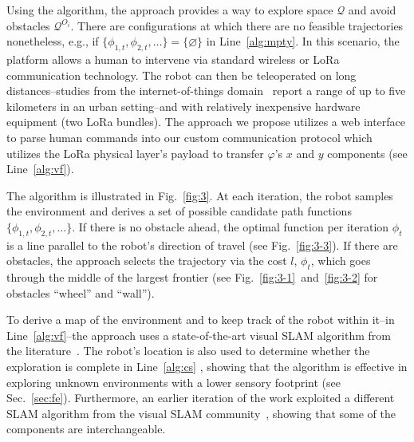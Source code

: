 \documentclass[lettersize,journal,twoside]{IEEEtran}
\theoremstyle{definition}
\begin{document}
Using the algorithm, the %
approach provides a way to explore space $\mathcal{Q}$ and avoid obstacles $\mathcal{Q}^{O_i}$. There are configurations at which there are no feasible trajectories nonetheless, e.g., if $\{\phi_{1,t},\phi_{2,t},\dots\}=\{\varnothing\}$ in Line~\ref{alg:mpty}. In this scenario, the %
platform allows a human to intervene via standard wireless or LoRa communication technology. The robot can then be teleoperated on long distances--studies from the internet-of-things domain~\cite{shanmuga2020survey%
} report a range of up to five kilometers in an urban setting--and with relatively inexpensive hardware equipment (two LoRa bundles). The %
approach we propose utilizes a web interface to parse human commands into our custom communication protocol which utilizes the LoRa physical layer's payload to transfer $\varphi$'s $x$ and $y$ components (see Line~\ref{alg:vf}).

The algorithm is illustrated in Fig.~\ref{fig:3}. At each iteration, the robot samples the environment and derives a set of possible candidate path functions $\{\phi_{1,t},\phi_{2,t},\dots\}$. If there is no obstacle ahead, the optimal function per iteration $\phi_t$ is a line parallel to the robot's direction of travel (see Fig.~\ref{fig:3-3}). If there are obstacles, the %
approach selects the trajectory via the cost $l$, $\phi_t$, which goes through the middle of the largest frontier (see Fig.~\ref{fig:3-1}~and~\ref{fig:3-2} for %
obstacles ``wheel'' and ``wall'').

To derive a map of the environment and to keep %
track of the robot within it--in Line~\ref{alg:vf}--the %
approach uses a state-of-the-art visual SLAM algorithm from the literature~\cite{labbe2019rtab}. The robot's location is also used to determine whether the exploration is complete in Line~\ref{alg:cs}%
, showing that the algorithm is effective in exploring unknown environments with a lower sensory footprint (see Sec.~\ref{sec:fe}). Furthermore, an earlier iteration of the work exploited a different SLAM algorithm from the visual SLAM community~\cite{campos2021orb}, showing that some of the %
components are interchangeable.
\end{document}
